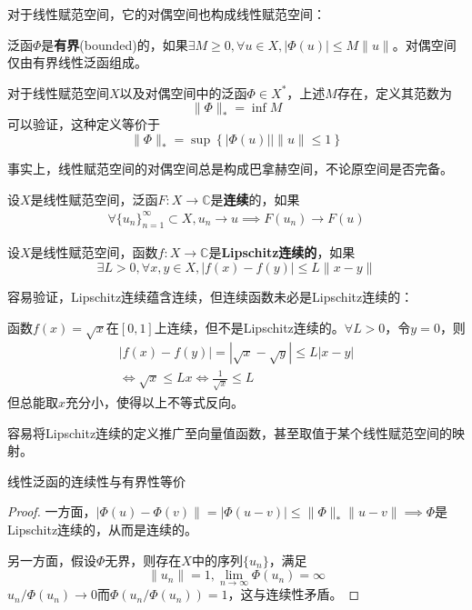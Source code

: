 对于线性赋范空间，它的对偶空间也构成线性赋范空间：
\begin{definition}[对偶空间的范数]
    泛函$\Phi$是\textbf{有界}(bounded)的，如果$\exists M\geq 0,\forall u\in X,|\Phi(u)|\leq M\|u\|$。对偶空间仅由有界线性泛函组成。

    对于线性赋范空间$X$以及对偶空间中的泛函$\Phi\in X^*$，上述$M$存在，定义其范数为
    \[\|\Phi\|_*=\inf M\]
    可以验证，这种定义等价于
    \[\|\Phi\|_*=\sup\left\{|\Phi(u)|\left|\|u\|\leq 1\right.\right\}\]
\end{definition}

事实上，线性赋范空间的对偶空间总是构成巴拿赫空间，不论原空间是否完备。

\begin{definition}[泛函的连续性]
    设$X$是线性赋范空间，泛函$F:X\to\mathbb{C} $是\textbf{连续}的，如果\begin{align*}
        \forall \{u_n\}_{n=1}^{\infty}\subset X,u_n\to u\implies F(u_n)\to F(u)
    \end{align*}
\end{definition}

\begin{definition}[Lipschitz连续]
    设$X$是线性赋范空间，函数$f:X\to \mathbb{C} $是\textbf{Lipschitz连续的}，如果
    $$\exists L>0,\forall x,y\in X,|f(x)-f(y)|\leq L\|x-y\|$$
\end{definition}

容易验证，Lipschitz连续蕴含连续，但连续函数未必是Lipschitz连续的：
\begin{example}
    函数$f(x)=\sqrt{x}$在$[0,1]$上连续，但不是Lipschitz连续的。$\forall L>0$，令$y=0$，则
    \begin{align*}
        |f(x)-f(y)|=|\sqrt{x}-\sqrt{y}|\leq L|x-y|\\
        \iff \sqrt{x}\leq Lx \iff \frac{1}{\sqrt{x}}\leq L
    \end{align*}
    但总能取$x$充分小，使得以上不等式反向。
\end{example}

容易将Lipschitz连续的定义推广至向量值函数，甚至取值于某个线性赋范空间的映射。

\begin{proposition}
    线性泛函的连续性与有界性等价
\end{proposition}
\begin{proof}
    一方面，$|\Phi(u)-\Phi(v)\|=|\Phi(u-v)|\leq\|\Phi\|_*\|u-v\|\implies$$\Phi$是Lipschitz连续的，从而是连续的。

    另一方面，假设$\Phi$无界，则存在$X$中的序列$\{u_n\}$，满足
    $$\|u_n\|=1,\lim_{n\to \infty}\Phi(u_n)=\infty$$
    $u_n/\Phi(u_n)\to 0$而$\Phi(u_n/\Phi(u_n))=1$，这与连续性矛盾。
\end{proof}

